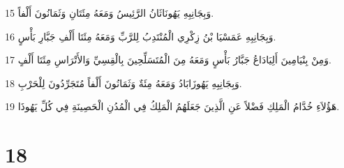 \par 15 وَبِجَانِبِهِ يَهُونَاثَانُ الرَّئِيسُ وَمَعَهُ مِئَتَانِ وَثَمَانُونَ أَلْفاً.
\par 16 وَبِجَانِبِهِ عَمَسْيَا بْنُ زِكْرِي الْمُنْتَدِبُ لِلرَّبِّ وَمَعَهُ مِئَتَا أَلْفِ جَبَّارِ بَأْسٍ.
\par 17 وَمِنْ بِنْيَامِينَ أَلِيَادَاعُ جَبَّارُ بَأْسٍ وَمَعَهُ مِنَ الْمُتَسَلِّحِينَ بِالْقِسِيِّ وَالأَتْرَاسِ مِئَتَا أَلْفٍ.
\par 18 وَبِجَانِبِهِ يَهُوزَابَادُ وَمَعَهُ مِئَةٌ وَثَمَانُونَ أَلْفاً مُتَجَرِّدُونَ لِلْحَرْبِ.
\par 19 هَؤُلاَءِ خُدَّامُ الْمَلِكِ فَضْلاً عَنِ الَّذِينَ جَعَلَهُمُ الْمَلِكُ فِي الْمُدُنِ الْحَصِينَةِ فِي كُلِّ يَهُوذَا.

\chapter{18}

